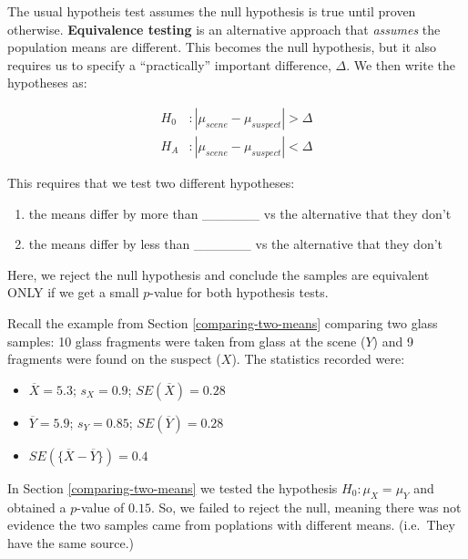 \documentclass[]{book}
\providecommand{\tightlist}{%
  \setlength{\itemsep}{0pt}\setlength{\parskip}{0pt}}
\theoremstyle{definition}
\theoremstyle{definition}
\theoremstyle{remark}
\begin{document}
The usual hypotheis test assumes the null hypothesis is true until
proven otherwise. \textbf{Equivalence testing} is an alternative
approach that \emph{assumes} the population means are different. This
becomes the null hypothesis, but it also requires us to specify a
``practically'' important difference, \(\Delta\). We then write the
hypotheses as:

\begin{equation}\label{eq:et}
\begin{split}
H_0 & :  |\mu_{scene} - \mu_{suspect} | > \Delta  \\
H_A & :  |\mu_{scene} - \mu_{suspect} | < \Delta  
\end{split}
\end{equation}

This requires that we test two different hypotheses:

\begin{enumerate}
\def\labelenumi{\arabic{enumi}.}
\tightlist
\item
  the means differ by more than \_\_\_\_\_\_ vs the alternative that
  they don't \vspace{.1in}
\item
  the means differ by less than \_\_\_\_\_\_ vs the alternative that
  they don't
\end{enumerate}

Here, we reject the null hypothesis and conclude the samples are
equivalent ONLY if we get a small \(p\)-value for both hypothesis tests.

Recall the example from Section \ref{comparing-two-means} comparing two
glass samples: 10 glass fragments were taken from glass at the scene
(\(Y\)) and 9 fragments were found on the suspect (\(X\)). The
statistics recorded were:

\begin{itemize}
\tightlist
\item
  \(\overline{X} = 5.3\); \(s_X = 0.9\); \(SE(\overline{X}) = 0.28\)
  \vspace{.1in}
\item
  \(\overline{Y} = 5.9\); \(s_Y = 0.85\); \(SE(\overline{Y}) = 0.28\)
  \vspace{.1in}
\item
  \(SE(\{\overline{X} - \overline{Y}\}) = 0.4\)
\end{itemize}

In Section \ref{comparing-two-means} we tested the hypothesis
\(H_0 : \mu_X = \mu_Y\) and obtained a \(p\)-value of \(0.15\). So, we
failed to reject the null, meaning there was not evidence the two
samples came from poplations with different means. (i.e.~They have the
same source.)
\end{document}

